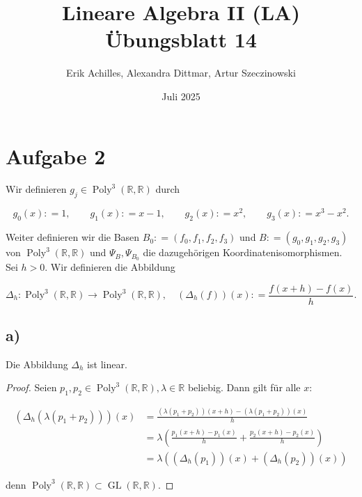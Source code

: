 \documentclass{article}
\title{Lineare Algebra II (LA) Übungsblatt 14}
\author{Erik Achilles, Alexandra Dittmar, Artur Szeczinowski}
\date{Juli 2025}
\newcommand{\RR}{\mathbb{R}}
\DeclareMathOperator{\Poly}{Poly}
\DeclareMathOperator{\GL}{GL}
\begin{document}
\section*{Aufgabe 2}

Wir definieren
$g_j \in \Poly^3(\RR, \RR)$
durch

\[
g_0(x) : = 1,
\qquad
g_1(x) : = x - 1,
\qquad
g_2(x) : = x^2,
\qquad
g_3(x) : = x^3 - x^2.
\]

Weiter definieren wir die Basen
$B_0 : = (f_0, f_1, f_2, f_3)$
und
$B : = (g_0, g_1, g_2, g_3)$
von
$\Poly^3(\RR, \RR)$
und
$\Psi_B, \Psi_{B_0}$
die dazugehörigen Koordinatenisomorphismen.
Sei
$h > 0$.
Wir definieren die Abbildung

\[
\Delta_h : \Poly^3(\RR, \RR) \to \Poly^3(\RR, \RR),
\quad
(\Delta_h(f))(x) : = \frac{f(x + h) - f(x)}{h}.
\]

\subsection*{a)}

Die Abbildung
$\Delta_h$
ist linear.

\begin{proof}
    Seien
    $p_1, p_2 \in \Poly^3(\RR,\RR), \lambda \in \RR$
    beliebig.
    Dann gilt für alle
    $ x $:
    
    \[
    \begin{aligned}
        (\Delta_h (\lambda(p_1 + p_2)))(x)
        &= 
        \frac{(\lambda(p_1 + p_2))(x + h) - (\lambda(p_1 + p_2))(x)}{h}
        \\ &=
        \lambda
        \left( \frac{p_1(x + h) - p_1(x)}{h}
        +
        \frac{p_2(x + h) - p_2(x)}{h} \right)
        \\ &= 
        \lambda
        \left( (\Delta_h (p_1))(x)
        +
        (\Delta_h (p_2))(x) \right)
    \end{aligned}
    \]
    
    denn 
    $ \Poly^3(\RR,\RR) \subset \GL(\RR,\RR) $.
    
\end{proof}
\end{document}
